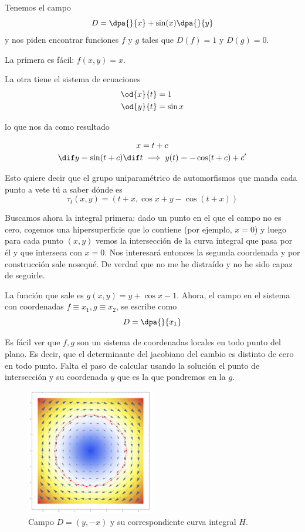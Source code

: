 \begin{example}
Tenemos el campo
\[ D = \dpa{}{x} + \sin(x) \dpa{}{y} \]
y nos piden encontrar funciones $f$ y $g$ tales que $D(f) = 1$ y $D(g) = 0$.

La primera es fácil: $f(x,y) = x$.

La otra tiene el sistema de ecuaciones
\begin{align*}
\od{x}{t} &= 1 \\
 \od{y}{t} &= \sin x
\end{align*}

lo que nos da como resultado

\begin{gather*}
x = t + c \\
\dif y = \sin(t+c) \dif t \implies y(t) = - \cos(t + c) + c'
\end{gather*}

Esto quiere decir que el grupo uniparamétrico de automorfismos que manda cada punto a vete tú a saber dónde es \[ τ_t(x,y) = \left(t+x, \cos x + y - \cos(t+x)\right)\]

Buscamos ahora la integral primera: dado un punto en el que el campo no es cero, cogemos una hipersuperficie que lo contiene (por ejemplo, $x=0$) y luego para cada punto $(x,y)$ vemos la intersección de la curva integral que pasa por él y que interseca con $x = 0$. Nos interesará entonces la segunda coordenada y por construcción sale nosequé. De verdad que no me he distraído y no he sido capaz de seguirle.

La función que sale es $g(x,y) = y + \cos x - 1$. Ahora, el campo en el sistema con coordenadas $f \equiv x_1,g \equiv x_2$, se escribe como \[ D = \dpa{}{x_1} \]

Es fácil ver que $f,g$ son un sistema de coordenadas locales en todo punto del plano. Es decir, que el determinante del jacobiano del cambio es distinto de cero en todo punto. Falta el paso de calcular usando la solución el punto de intersección y su coordenada $y$ que es la que pondremos en la $g$.

\begin{figure}[hbtp]
\centering
\includegraphics[width=0.5\textwidth]{img/III_CampoCircular.png}
\caption{Campo $D = (y, -x)$ y su correspondiente curva integral $H$.}
\end{figure}
\end{example}

